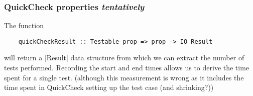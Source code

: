 \subsubsection{QuickCheck properties \emph{tentatively}} The function
\begin{verbatim}
    quickCheckResult :: Testable prop => prop -> IO Result
\end{verbatim}
will return a |Result| data structure from which we can extract the number of
tests performed.
Recording the start and end times allows us to derive the time spent for a
single test. (although this measurement is wrong as it includes the time spent
in QuickCheck setting up the test case (and shrinking?))
